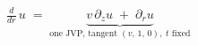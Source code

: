 \documentclass[border=10pt,varwidth=\maxdimen]{standalone}
\begin{document}
\(\displaystyle \frac{d}{dr}\, u \;=\; \underbrace{v\,\partial_z u \;+\; \partial_r u}_{\text{one JVP, tangent }(v,\,1,\,0),\; t\text{ fixed}} \)
\end{document}
